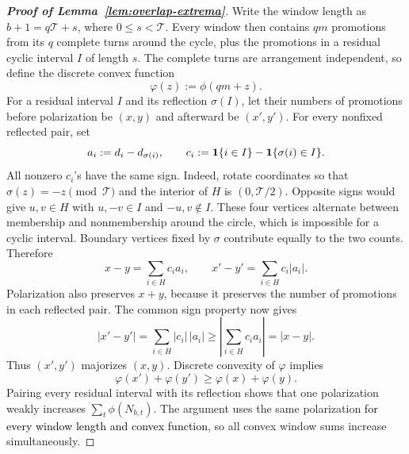 \begin{proof}[\normalfont\bfseries Proof of Lemma~\ref{lem:overlap-extrema}]
            Write the window length as \(b+1=q\mathcal T+s\), where \(0\le s<\mathcal T\). Every window then contains \(qm\) promotions from its \(q\) complete turns around the cycle, plus the promotions in a residual cyclic interval \(I\) of length \(s\). The complete turns are arrangement independent, so define the discrete convex function
            \[
                \varphi(z):=\phi(qm+z).
            \]
            For a residual interval \(I\) and its reflection \(\sigma(I)\), let their numbers of promotions before polarization be \((x,y)\) and afterward be \((x',y')\). For every nonfixed reflected pair, set
            \[
                a_i:=d_i-d_{\sigma(i)},
                \qquad
                c_i:=\mathbf{1}\{i\in I\}-\mathbf{1}\{\sigma(i)\in I\}.
            \]
            All nonzero \(c_i\)'s have the same sign. Indeed, rotate coordinates so that \(\sigma(z)=-z\pmod{\mathcal T}\) and the interior of \(H\) is \((0,\mathcal T/2)\). Opposite signs would give \(u,v\in H\) with \(u,-v\in I\) and \(-u,v\notin I\). These four vertices alternate between membership and nonmembership around the circle, which is impossible for a cyclic interval. Boundary vertices fixed by \(\sigma\) contribute equally to the two counts. Therefore
            \[
                x-y=\sum_{i\in H}c_i a_i,
                \qquad
                x'-y'=\sum_{i\in H}c_i|a_i|.
            \]
            Polarization also preserves \(x+y\), because it preserves the number of promotions in each reflected pair. The common sign property now gives
            \[
                |x'-y'|
                =\sum_{i\in H}|c_i|\,|a_i|
                \ge
                \left|\sum_{i\in H}c_i a_i\right|
                =|x-y|.
            \]
            Thus \((x',y')\) majorizes \((x,y)\). Discrete convexity of \(\varphi\) implies
            \[
                \varphi(x')+\varphi(y')\ge \varphi(x)+\varphi(y).
            \]
            Pairing every residual interval with its reflection shows that one polarization weakly increases \(\sum_t\phi(N_{b,t})\). The argument uses the same polarization \textcolor{black}{for every window length and convex function}, so all convex window sums increase simultaneously.


\end{proof}
